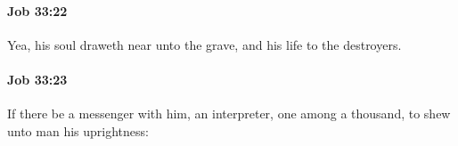 		\paragraph{Job 33:22} %
			\label{JOB-33-22}

			Yea, his soul draweth near unto the grave, and his life to the destroyers.


		\paragraph{Job 33:23} %
			\label{JOB-33-23}

			If there be a messenger with him, an interpreter, one among a thousand, to shew unto man his uprightness:


